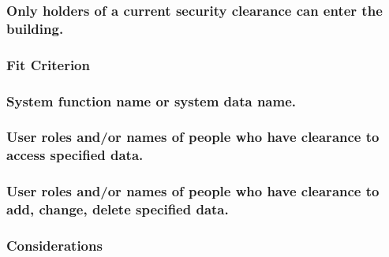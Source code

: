 \documentclass[
]{article}
\begin{document}
\hypertarget{only-holders-of-a-current-security-clearance-can-enter-the-building.}{%
\subsubsection{Only holders of a current security clearance can enter
the
building.}\label{only-holders-of-a-current-security-clearance-can-enter-the-building.}}

\hypertarget{fit-criterion-11}{%
\subsubsection{Fit Criterion}\label{fit-criterion-11}}

\hypertarget{system-function-name-or-system-data-name.}{%
\subsubsection{System function name or system data
name.}\label{system-function-name-or-system-data-name.}}

\hypertarget{user-roles-andor-names-of-people-who-have-clearance-to-access-specified-data.}{%
\subsubsection{User roles and/or names of people who have clearance to
access specified
data.}\label{user-roles-andor-names-of-people-who-have-clearance-to-access-specified-data.}}

\hypertarget{user-roles-andor-names-of-people-who-have-clearance-to-add-change-delete-specified-data.}{%
\subsubsection{User roles and/or names of people who have clearance to
add, change, delete specified
data.}\label{user-roles-andor-names-of-people-who-have-clearance-to-add-change-delete-specified-data.}}

\hypertarget{considerations-36}{%
\subsubsection{Considerations}\label{considerations-36}}
\end{document}
